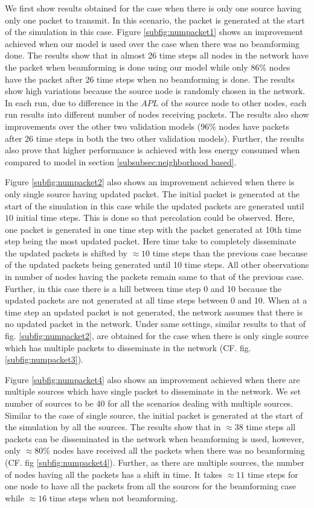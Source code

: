 \documentclass[preprint, twocolumn,5p]{elsarticle}
\begin{document}
    We first show results obtained for the case when there is only one source having only one packet to transmit. In this scenario, the packet is generated at the start of the simulation in this case. Figure \ref{subfig:numpacket1} shows an improvement achieved when our model is used over the case when there was no beamforming done. The results show that in almost 26 time steps all nodes in the network have the packet when beamforming is done using our model while only $86\%$ nodes have the packet after 26 time steps when no beamforming is done. The results show high variations because the source node is randomly chosen in the network. In each run, due to difference in the $APL$ of the source node to other nodes, each run results into different number of nodes receiving packets. The results also show improvements over the other two validation models ($96\%$ nodes have packets after 26 time steps in both the two other validation models). Further, the results also prove that higher performance is achieved with less energy consumed when compared to model in section \ref{subsubsec:neighborhood based}.

    Figure \ref{subfig:numpacket2} also shows an improvement achieved when there is only single source having updated packet. The initial packet is generated at the start of the simulation in this case while the updated packets are generated until $10$ initial time steps. This is done so that percolation could be observed. Here, one packet is generated in one time step with the packet generated at 10th time step being the most updated packet. Here time take to completely disseminate the updated packets is shifted by $\approx10$ time steps than the previous case because of the updated packets being generated until 10 time steps. All other observations in number of nodes having the packets remain same to that of the previous case. Further, in this case there is a hill between time step 0 and 10 because the updated packets are not generated at all time steps between 0 and 10. When at a time step an updated packet is not generated, the network assumes that there is no updated packet in the network. Under same settings, similar results to that of fig. \ref{subfig:numpacket2}, are obtained for the case when there is only single source which has multiple packets to disseminate in the network (CF. fig. \ref{subfig:numpacket3}).

    Figure \ref{subfig:numpacket4} also shows an improvement achieved when there are multiple sources which have single packet to disseminate in the network. We set number of sources to be 40 for all the scenarios dealing with multiple sources. Similar to the case of single source, the initial packet is generated at the start of the simulation by all the sources. The results show that in $\approx38$ time steps all packets can be disseminated in the network when beamforming is used, however, only $\approx80\%$ nodes have received all the packets when there was no beamforming (CF. fig \ref{subfig:numpacket4}). Further, as there are multiple sources, the number of nodes having all the packets has a shift in time. It takes $\approx11$ time steps for one node to have all the packets from all the sources for the beamforming case while $\approx16$ time steps when not beamforming.
\end{document}
